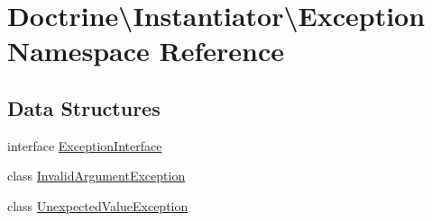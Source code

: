 \hypertarget{namespace_doctrine_1_1_instantiator_1_1_exception}{}\section{Doctrine\textbackslash{}Instantiator\textbackslash{}Exception Namespace Reference}
\label{namespace_doctrine_1_1_instantiator_1_1_exception}
\subsection*{Data Structures}
\begin{DoxyCompactItemize}
\item 
interface \mbox{\hyperlink{interface_doctrine_1_1_instantiator_1_1_exception_1_1_exception_interface}{Exception\+Interface}}
\item 
class \mbox{\hyperlink{class_doctrine_1_1_instantiator_1_1_exception_1_1_invalid_argument_exception}{Invalid\+Argument\+Exception}}
\item 
class \mbox{\hyperlink{class_doctrine_1_1_instantiator_1_1_exception_1_1_unexpected_value_exception}{Unexpected\+Value\+Exception}}
\end{DoxyCompactItemize}
